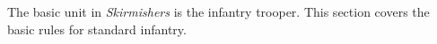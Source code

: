 The basic unit in \emph{Skirmishers} is the infantry trooper.
This section covers the basic rules for standard infantry.
